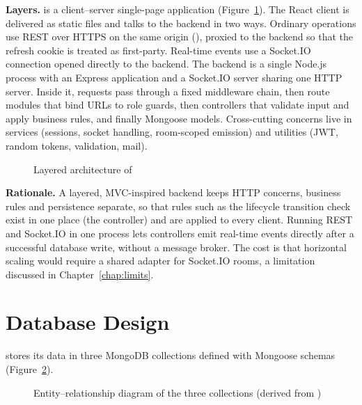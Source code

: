 \textbf{Layers.} \scpms{} is a client--server single-page application (Figure~\ref{fig:architecture}). The React client is delivered as static files and talks to the backend in two ways. Ordinary operations use REST over HTTPS on the same origin (), proxied to the backend so that the refresh cookie is treated as first-party. Real-time events use a Socket.IO connection opened directly to the backend. The backend is a single Node.js process with an Express application and a Socket.IO server sharing one HTTP server. Inside it, requests pass through a fixed middleware chain, then route modules that bind URLs to role guards, then controllers that validate input and apply business rules, and finally Mongoose models. Cross-cutting concerns live in services (sessions, socket handling, room-scoped emission) and utilities (JWT, random tokens, validation, mail).

\begin{figure}[htbp]
\centering
\resizebox{\textwidth}{!}{}
\caption{Layered architecture of \scpms}
\label{fig:architecture}
\end{figure}

\textbf{Rationale.} A layered, MVC-inspired backend keeps HTTP concerns, business rules and persistence separate, so that rules such as the lifecycle transition check exist in one place (the controller) and are applied to every client. Running REST and Socket.IO in one process lets controllers emit real-time events directly after a successful database write, without a message broker. The cost is that horizontal scaling would require a shared adapter for Socket.IO rooms, a limitation discussed in Chapter~\ref{chap:limits}.

\section{Database Design}
\label{sec:dbdesign}

\scpms{} stores its data in three MongoDB collections defined with Mongoose schemas (Figure~\ref{fig:er}).

\begin{figure}[htbp]
\centering
\resizebox{0.95\textwidth}{!}{}
\caption[Entity--relationship diagram of the three collections]{Entity--relationship diagram of the three collections (derived from )}
\label{fig:er}
\end{figure}

